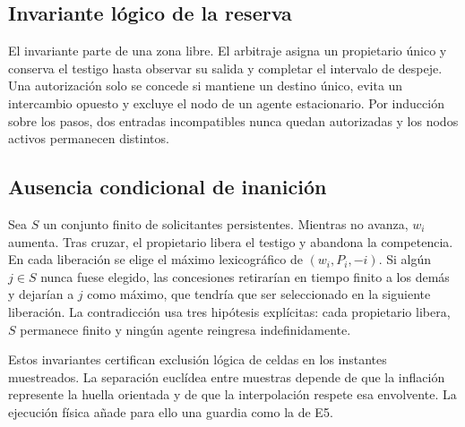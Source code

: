 \subsection{Invariante lógico de la reserva}
\label{app:sp7-reservation-invariant}

El invariante parte de una zona libre. El arbitraje asigna un propietario único y conserva el testigo hasta observar su salida y completar el intervalo de despeje. Una autorización solo se concede si mantiene un destino único, evita un intercambio opuesto y excluye el nodo de un agente estacionario. Por inducción sobre los pasos, dos entradas incompatibles nunca quedan autorizadas y los nodos activos permanecen distintos.

\subsection{Ausencia condicional de inanición}
\label{app:sp7-no-starvation}

Sea $S$ un conjunto finito de solicitantes persistentes. Mientras no avanza, $w_i$ aumenta. Tras cruzar, el propietario libera el testigo y abandona la competencia. En cada liberación se elige el máximo lexicográfico de $(w_i,P_i,-i)$. Si algún \(j\in S\) nunca fuese elegido, las concesiones retirarían en tiempo finito a los demás y dejarían a \(j\) como máximo, que tendría que ser seleccionado en la siguiente liberación. La contradicción usa tres hipótesis explícitas: cada propietario libera, \(S\) permanece finito y ningún agente reingresa indefinidamente.

Estos invariantes certifican exclusión lógica de celdas en los instantes muestreados. La separación euclídea entre muestras depende de que la inflación represente la huella orientada y de que la interpolación respete esa envolvente. La ejecución física añade para ello una guardia como la de E5.
